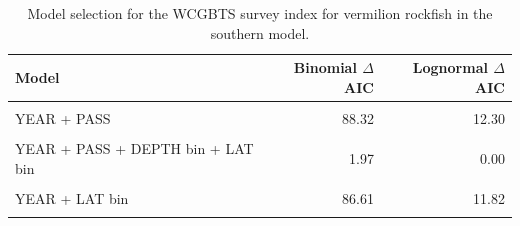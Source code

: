 \documentclass[11pt,
  english,
]{article}
\begin{document}
\FloatBarrier

\begin{table}

\caption{\label{tab:tab-model-select-wcgbts}Model selection for the WCGBTS survey index for vermilion rockfish in the southern model.}
\centering
\begin{tabular}[t]{lrr}
\toprule
Model & Binomial $\Delta$AIC & Lognormal $\Delta$AIC\\
\midrule
\cellcolor{gray!6}{1} & \cellcolor{gray!6}{79.86} & \cellcolor{gray!6}{12.60}\\
YEAR + PASS & 88.32 & 12.30\\
\cellcolor{gray!6}{YEAR + PASS + DEPTH bin} & \cellcolor{gray!6}{2.07} & \cellcolor{gray!6}{1.87}\\
YEAR + PASS + DEPTH bin + LAT bin & 1.97 & 0.00\\
\cellcolor{gray!6}{YEAR + DEPTH bin + LAT bin} & \cellcolor{gray!6}{0.00} & \cellcolor{gray!6}{1.15}\\
\addlinespace
YEAR + LAT bin & 86.61 & 11.82\\
\cellcolor{gray!6}{YEAR + PASS + LAT bin} & \cellcolor{gray!6}{88.41} & \cellcolor{gray!6}{11.24}\\
\bottomrule
\end{tabular}
\end{table}

\FloatBarrier
\end{document}
